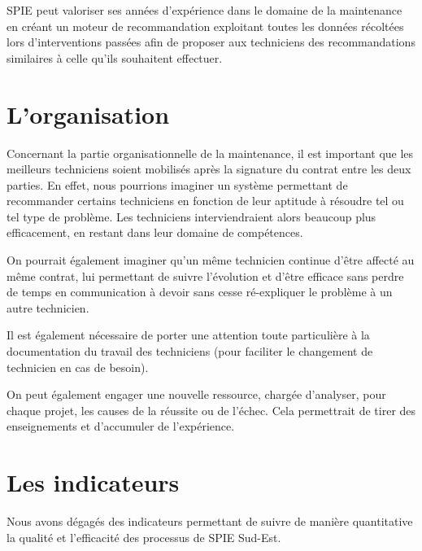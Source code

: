         SPIE peut valoriser ses années d'expérience dans le domaine de la maintenance en créant un moteur de recommandation exploitant toutes les données récoltées lors d'interventions passées afin de proposer aux techniciens des recommandations similaires à celle qu'ils souhaitent effectuer.

\section{L'organisation}
Concernant la partie organisationnelle de la maintenance, il est important que les meilleurs techniciens soient mobilisés après la signature du contrat entre les deux parties. En effet, nous pourrions imaginer un système permettant de recommander certains techniciens en fonction de leur aptitude à résoudre tel ou tel type de problème. Les techniciens interviendraient alors beaucoup plus efficacement, en restant dans leur domaine de compétences.

On pourrait également imaginer qu'un même technicien continue d'être affecté au même contrat, lui permettant de suivre l'évolution et d'être efficace sans perdre de temps en communication à devoir sans cesse ré-expliquer le problème à un autre technicien.

Il est également nécessaire de porter une attention toute particulière à la documentation du travail des techniciens (pour faciliter le changement de technicien en cas de besoin).

On peut également engager une nouvelle ressource, chargée d'analyser, pour chaque projet, les causes de la réussite ou de l'échec. Cela permettrait de tirer des enseignements et d'accumuler de l'expérience.

\section{Les indicateurs}

    Nous avons dégagés des indicateurs permettant de suivre de manière quantitative la qualité et l'efficacité des processus de SPIE Sud-Est.

